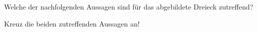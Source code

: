 \begin{beispiel}[AG 4.1]{1}
Welche der nachfolgenden Aussagen sind für das abgebildete Dreieck zutreffend?

Kreuz die beiden zutreffenden Aussagen an!
\end{beispiel}
